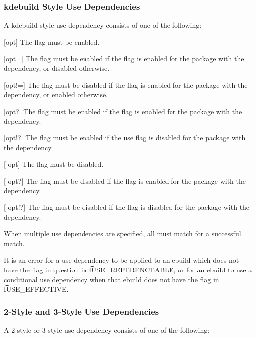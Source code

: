 \IFKDEBUILDELSE
{
    \subsubsection{kdebuild Style Use Dependencies}
    \label{sec:kdebuild-use-dep}

    A kdebuild-style use dependency consists of one of the following:

    \begin{description}
    \item{[opt]} The flag must be enabled.
    \item{[opt=]} The flag must be enabled if the flag is enabled for the package with the
        dependency, or disabled otherwise.
    \item{[opt!=]} The flag must be disabled if the flag is enabled for the package with the
        dependency, or enabled otherwise.
    \item{[opt?]} The flag must be enabled if the flag is enabled for the package with the
        dependency.
    \item{[opt!?]} The flag must be enabled if the use flag is disabled for the package with the
        dependency.
    \item{[-opt]} The flag must be disabled.
    \item{[-opt?]} The flag must be disabled if the flag is enabled for the package with the
        dependency.
    \item{[-opt!?]} The flag must be disabled if the flag is disabled for the package with the
        dependency.
    \end{description}

    When multiple use dependencies are specified, all must match for a successful match.

    It is an error for a use dependency to be applied to an ebuild which does not have the flag in
    question in \t{IUSE\_REFERENCEABLE}, or for an ebuild to use a conditional use dependency when
    that ebuild does not have the flag in \t{IUSE\_EFFECTIVE}.
}{
}

\subsubsection{2-Style and 3-Style Use Dependencies}
\label{sec:use-dep}

A 2-style or 3-style use dependency consists of one of the following:

